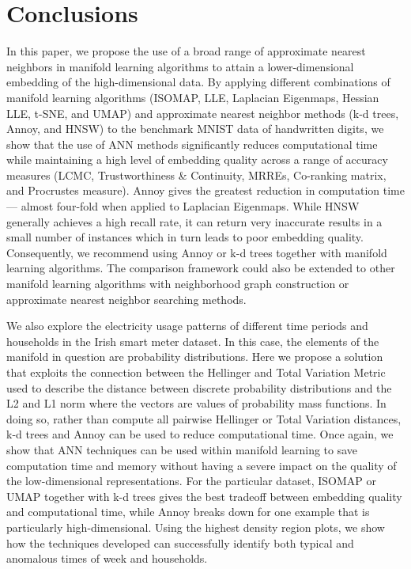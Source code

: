 \documentclass[11pt,a4paper,]{article}
\begin{document}
\hypertarget{conclusion}{%
\section{Conclusions}\label{conclusion}}

In this paper, we propose the use of a broad range of approximate nearest neighbors in manifold learning algorithms to attain a lower-dimensional embedding of the high-dimensional data. By applying different combinations of manifold learning algorithms (ISOMAP, LLE, Laplacian Eigenmaps, Hessian LLE, t-SNE, and UMAP) and approximate nearest neighbor methods (k-d trees, Annoy, and HNSW) to the benchmark MNIST data of handwritten digits, we show that the use of ANN methods significantly reduces computational time while maintaining a high level of embedding quality across a range of accuracy measures (LCMC, Trustworthiness \& Continuity, MRREs, Co-ranking matrix, and Procrustes measure). Annoy gives the greatest reduction in computation time --- almost four-fold when applied to Laplacian Eigenmaps. While HNSW generally achieves a high recall rate, it can return very inaccurate results in a small number of instances which in turn leads to poor embedding quality. Consequently, we recommend using Annoy or k-d trees together with manifold learning algorithms. The comparison framework could also be extended to other manifold learning algorithms with neighborhood graph construction or approximate nearest neighbor searching methods.

We also explore the electricity usage patterns of different time periods and households in the Irish smart meter dataset. In this case, the elements of the manifold in question are probability distributions. Here we propose a solution that exploits the connection between the Hellinger and Total Variation Metric used to describe the distance between discrete probability distributions and the L2 and L1 norm where the vectors are values of probability mass functions. In doing so, rather than compute all pairwise Hellinger or Total Variation distances, k-d trees and Annoy can be used to reduce computational time.
Once again, we show that ANN techniques can be used within manifold learning to save computation time and memory without having a severe impact on the quality of the low-dimensional representations. For the particular dataset, ISOMAP or UMAP together with k-d trees gives the best tradeoff between embedding quality and computational time, while Annoy breaks down for one example that is particularly high-dimensional. Using the highest density region plots, we show how the techniques developed can successfully identify both typical and anomalous times of week and households.
\end{document}
